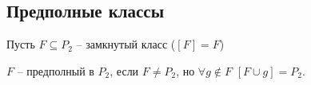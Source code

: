 \subsection{Предполные классы}

Пусть $F \subseteq P_2$ -- замкнутый класс ($[F] = F$)

$F$ -- предполный в $P_2$, если $F \neq P_2$, но $\forall g \notin F$ $[F \cup {g}] = P_2$.
